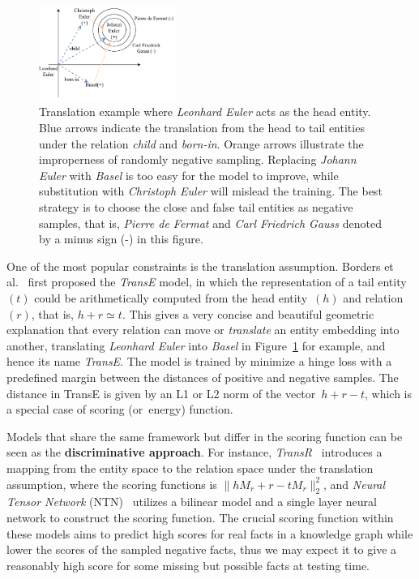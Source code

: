 \documentclass[twocolumn,a4paper,preprint,10pt,3p]{elsarticle}
\begin{document}
\begin{figure}[htbp]
    \centering
    \includegraphics[width=0.4\textwidth]{translation.pdf}
    \caption{Translation example where \emph{Leonhard Euler} acts as the head entity. Blue arrows indicate the translation from the head to tail entities under the relation \emph{child} and \emph{born-in}. Orange arrows illustrate the improperness of randomly negative sampling. Replacing \emph{Johann Euler} with \emph{Basel} is too easy for the model to improve, while substitution with \emph{Christoph Euler} will mislead the training. The best strategy is to choose the close and false tail entities as negative samples, that is, \emph{Pierre de Fermat} and \emph{Carl Friedrich Gauss} denoted by a minus sign (-) in this figure.}
\label{translation-example}
\end{figure}

One of the most popular constraints is the translation assumption. Borders et al.~\cite{TransE2013} first proposed the \emph{TransE} model, in which the representation of a tail entity~$(t)$ could be arithmetically computed from the head entity~$(h)$ and relation~$(r)$, that is, $h + r \simeq t$. This gives a very concise and beautiful geometric explanation that every relation can move or \emph{translate} an entity embedding into another, translating \emph{Leonhard Euler} into \emph{Basel} in Figure~\ref{translation-example} for example, and hence its name \emph{TransE}.
The model is trained by minimize a hinge loss with a predefined margin between the distances of positive and negative samples. The distance in TransE is given by an L1 or L2 norm of the vector~$h + r - t$, which is a special case of scoring (or~energy) function.

Models that share the same framework but differ in the scoring function can be seen as the \textbf{discriminative approach}. For instance, \emph{TransR}~\cite{TransR2015} introduces a mapping from the entity space to the relation space under the translation assumption, where the scoring functions is $\lVert h M_r + r - t M_r \rVert_2^2 $, and \emph{Neural Tensor Network} (NTN)~\cite{NTN} utilizes a bilinear model and a single layer neural network to construct the scoring function. The crucial scoring function within these models aims to predict high scores for real facts in a knowledge graph while lower the scores of the sampled negative facts, thus we may expect it to give a reasonably high score for some missing but possible facts at testing time.
\end{document}
